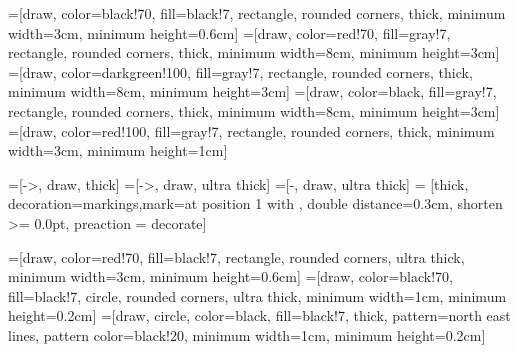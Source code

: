 
\newcommand{\comment}[1]{\ignorespaces {\bf{\textcolor{red}{Comment} :
}{\textcolor{red}{#1}}} }

\newcommand*\todo[1]{\stepcounter{todoCtr}%
        {\bf\textcolor{red}{TODO} \#\arabic{todoCtr}: }%
        \textcolor{red}{#1} }


\usepackage{xspace}
\usetikzlibrary{patterns}
=[draw, color=black!70, fill=black!7, rectangle, rounded
corners, thick, minimum width=3cm, minimum height=0.6cm]
=[draw, color=red!70, fill=gray!7, rectangle, rounded
corners, thick, minimum width=8cm, minimum height=3cm]
=[draw, color=darkgreen!100, fill=gray!7, rectangle, rounded
corners, thick, minimum width=8cm, minimum height=3cm]
=[draw, color=black, fill=gray!7, rectangle, rounded
corners, thick, minimum width=8cm, minimum height=3cm]
=[draw, color=red!100, fill=gray!7, rectangle, rounded
corners, thick, minimum width=3cm, minimum height=1cm]

=[->, draw, thick]
=[->, draw, ultra thick]
=[-, draw, ultra thick]
 = [thick, decoration={markings,mark=at position
   1 with {}},
   double distance=0.3cm, shorten >= 0.0pt,
   preaction = {decorate}]



=[draw, color=red!70, fill=black!7, rectangle, rounded
corners, ultra thick, minimum width=3cm, minimum height=0.6cm]
=[draw, color=black!70, fill=black!7, circle, rounded
corners, ultra thick, minimum width=1cm, minimum height=0.2cm]
=[draw, circle, color=black, fill=black!7, thick, pattern=north east lines, pattern color=black!20, minimum width=1cm, minimum height=0.2cm]


